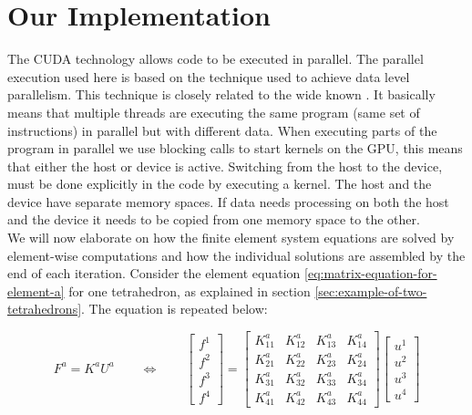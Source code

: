 \section{Our Implementation}
The CUDA technology allows code to be executed in parallel. The
parallel execution used here is based on the  technique used to achieve data level parallelism. 
This technique is closely related to the wide known
.
It basically means that multiple threads are executing the
same program (same set of instructions) in parallel but with different
data.
%
When executing parts of the program in parallel we use blocking calls
to start kernels on the GPU, this means that either the host or
device is active. Switching from the host to the device, must be done
explicitly in the code by executing a kernel. The host and the
device have separate memory spaces. If data needs processing on both
the host and the device it needs to be copied from one memory space to
the other. \\
%
%

We will now elaborate on how the finite element system equations are
solved by element-wise computations and how the individual solutions
are assembled by the end of each iteration.
Consider the element equation
\eqref{eq:matrix-equation-for-element-a} for one tetrahedron, as
explained in section \vref{sec:example-of-two-tetrahedrons}. The
equation is repeated below:

\begin{equation*}
F^a = K^a U^a
\qquad \Leftrightarrow \qquad
\begin{bmatrix}
f^1 \\
f^2 \\
f^3 \\
f^4
\end{bmatrix}
=
\begin{bmatrix}
K^a_{11} & K^a_{12} & K^a_{13} & K^a_{14} \\
K^a_{21} & K^a_{22} & K^a_{23} & K^a_{24} \\
K^a_{31} & K^a_{32} & K^a_{33} & K^a_{34} \\
K^a_{41} & K^a_{42} & K^a_{43} & K^a_{44}
\end{bmatrix}
\begin{bmatrix}
u^1 \\
u^2 \\
u^3 \\
u^4
\end{bmatrix}
\end{equation*}

